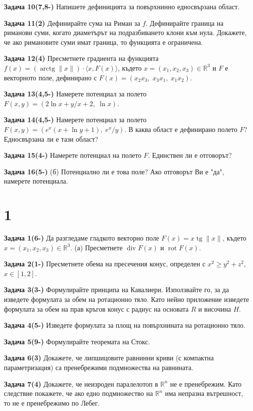 \documentclass[10pt]{article}
\begin{document}
\textbf{Задача 10(7,8-) }Напишете дефиницията за повърхнинно едносвързана област. 

\textbf{Задача 11(2) }Дефинирайте сума на Риман за $f$. Дефинирайте граница на риманови суми, когато диаметърът на подразбиването клони към нула. Докажете, че ако римановите суми имат граница, то функцията е ограничена. 

\textbf{Задача 12(4) }Пресметнете градиента на функцията $f(x) = (\operatorname{arctg}\|x\|)\cdot\langle x,F(x)\rangle$, където $x = (x_1,x_2,x_3) \in \mathbb{R}^3$ и $F$ е векторното поле, дефинирано с $F(x) = (x_2x_3,\; x_3x_1,\; x_1x_2)$. 

\textbf{Задача 13(4,5-) }Намерете потенциал за полето $F(x,y) = (2\ln x + y/x + 2,\; \ln x)$. 

\textbf{Задача 14(4,5-) }Намерете потенциал за полето $F(x,y) = (e^x(x+\ln y+1),\; e^x/y)$. В каква област е дефинирано полето $F$? Едносвързана ли е тази област?

\textbf{Задача 15(4-) }Намерете потенциал на полето $F$. Единствен ли е отговорът? 

\textbf{Задача 16(5-) }(б) Потенциално ли е това поле? Ако отговорът Ви е "да", намерете потенциала. 

\section*{1}

\textbf{Задача 1(6-) }Да разгледаме гладкото векторно поле $F(x) = x \operatorname{tg}\|x\|$, където $x = (x_1,x_2,x_3) \in \mathbb{R}^3$. (а) Пресметнете $\operatorname{div} F(x)$ и $\operatorname{rot} F(x)$.

\textbf{Задача 2(1-) }Пресметнете обема на пресечения конус, определен с $x^2 \ge y^2 + z^2$, $x \in [1,2]$.

\textbf{Задача 3(3-) }Формулирайте принципа на Кавалиери. Използвайте го, за да изведете формулата за обем на ротационно тяло. Като нейно приложение изведете формулата за обем на прав кръгов конус с радиус на основата $R$ и височина $H$. 

\textbf{Задача 4(5-) }Изведете формулата за площ на повърхнината на ротационно тяло. 

\textbf{Задача 5(9-) }Формулирайте теоремата на Стокс. 

\textbf{Задача 6(3) }Докажете, че липшицовите равнинни криви (с компактна параметризация) са пренебрежими подмножества на равнината. 

\textbf{Задача 7(4) }Докажете, че неизроден паралелотоп в $\mathbb{R}^n$ не е пренебрежим. Като следствие покажете, че ако едно подмножество на $\mathbb{R}^n$ има непразна вътрешност, то не е пренебрежимо по Лебег. 
\end{document}
